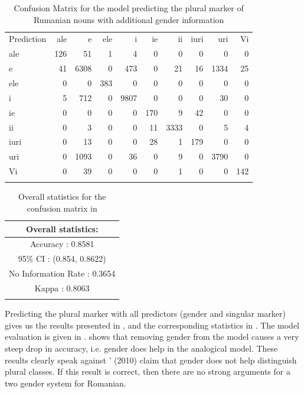 \begin{table}
  \centering
  \begin{tabular}{lrrrrrrrrr}
    \lsptoprule
    \multicolumn{10}{c}{Reference}                                        \\
    \midrule
    Prediction & ale & e    & ele & i    & ie  & ii   & iuri & uri  & Vi  \\
    ale        & 126 & 51   & 1   & 4    & 0   & 0    & 0    & 0    & 0   \\
    e          & 41  & 6308 & 0   & 473  & 0   & 21   & 16   & 1334 & 25  \\
    ele        & 0   & 0    & 383 & 0    & 0   & 0    & 0    & 0    & 0   \\
    i          & 5   & 712  & 0   & 9807 & 0   & 0    & 0    & 30   & 0   \\
    ie         & 0   & 0    & 0   & 0    & 170 & 9    & 42   & 0    & 0   \\
    ii         & 0   & 3    & 0   & 0    & 11  & 3333 & 0    & 5    & 4   \\
    iuri       & 0   & 13   & 0   & 0    & 28  & 1    & 179  & 0    & 0   \\
    uri        & 0   & 1093 & 0   & 36   & 0   & 9    & 0    & 3790 & 0   \\
    Vi         & 0   & 39   & 0   & 0    & 0   & 1    & 0    & 0    & 142 \\
    \lspbottomrule
  \end{tabular}
  \caption{Confusion Matrix for the model predicting the plural marker of Rumanian nouns with additional gender information}
  \label{tab:plural-romanian-2}
\end{table}

\begin{table}
  \centering
  \begin{tabular}{c}
    \lsptoprule
    Overall statistics: \\
    \midrule
    Accuracy : 0.8581\\
    95\% CI : (0.854, 0.8622)\\
    No Information Rate : 0.3654\\
    Kappa : 0.8063\\
    \lspbottomrule
  \end{tabular}
  \caption{Overall statistics for the confusion matrix in }\label{tab:plural-romanian-stats-2}
\end{table}

Predicting the plural marker with all predictors (gender and singular marker) gives us the results presented in , and the corresponding statistics in . The model evaluation is given in .  shows that removing gender from the model causes a very steep drop in accuracy, i.e. gender does help in the analogical model. These results clearly speak against \citeauthor{Bateman.2010}' (2010) claim that gender does not help distinguish plural classes. If this result is correct, then there are no strong arguments for a two gender system for Romanian.

